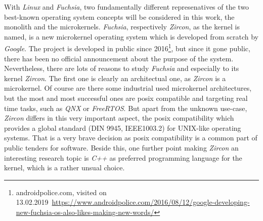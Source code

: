 With \textit{Linux} and \textit{Fuchsia}, two fundamentally different represenatives of the two best-known operating system concepts will be considered in this work, the monolith and the microkernels. %
\textit{Fuchsia}, respectively \textit{Zircon}, as the kernel is named, is a new microkernel operating system which is developed from scratch by \textit{Google}.
The project is developed in public since 2016\footnote{androidpolice.com, visited on 13.02.2019~\url{https://www.androidpolice.com/2016/08/12/google-developing-new-fuchsia-os-also-likes-making-new-words/}}, but since it gone public, there has been no official announcement about the purpose of the system.
Nevertheless, there are lots of reasons to study \textit{Fuchsia} and especially to its kernel \textit{Zircon}.
The first one is clearly an architectual one, as \textit{Zircon} is a microkernel.
Of course are there some industrial used microkernel architectures, but the most and most successful ones are \ac{posix} compatible and targeting real time tasks, such as \textit{QNX} or \textit{FreeRTOS}. %
But apart from the unknown use-case, \textit{Zircon} differs in this very important aspect, the \ac{posix} compatibility which provides a global standard (DIN 9945, IEEE1003.2) for UNIX-like operating systems\cite{wolf2009c}.
That is a very brave decision as \ac{posix} compatibility is a common part of public tenders for software.
Beside this, one further point making \textit{Zircon} an interesting research topic is \textit{C++} as preferred programming language for the kernel, which is a rather unsual choice\cite{tanenbaum-modern-operating-systems}.

